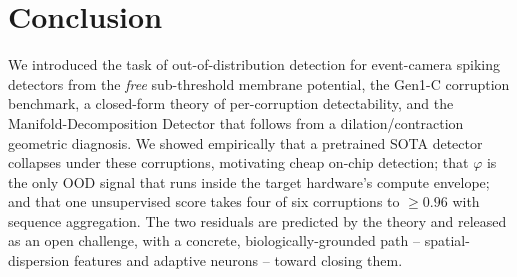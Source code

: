 \section{Conclusion}
\label{sec:conclusion}

We introduced the task of out-of-distribution detection for event-camera spiking detectors
from the \emph{free} sub-threshold membrane potential, the Gen1-C corruption benchmark, a
closed-form theory of per-corruption detectability, and the Manifold-Decomposition Detector
that follows from a dilation/contraction geometric diagnosis. We showed empirically that a
pretrained SOTA detector collapses under these corruptions, motivating cheap on-chip
detection; that $\varphi$ is the only OOD signal that runs inside the target hardware's
compute envelope; and that one unsupervised score takes four of six corruptions to
$\geq 0.96$ with sequence aggregation. The two residuals are predicted by the theory and
released as an open challenge, with a concrete, biologically-grounded path -- spatial-
dispersion features and adaptive neurons -- toward closing them.

